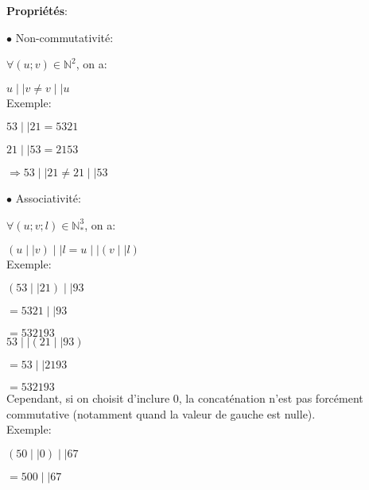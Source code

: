 \documentclass[a4paper, 12pt]{article}
\begin{document}
\noindent \textbf{Propriétés}:

\noindent $\bullet$ Non-commutativité:

$\forall \left( u; v \right) \in \mathbb{N}^{2}$, on a:

$u \mid\mid v \neq v \mid\mid u$ \\

Exemple:

\hspace{\parindent} $53 \mid\mid 21 = 5321$

\hspace{\parindent} $21 \mid\mid 53 = 2153$

\hspace{\parindent} $\Rightarrow 53 \mid\mid 21 \neq 21 \mid\mid 53$


\newpage

\noindent $\bullet$ Associativité:

$\forall \left( u; v; l \right) \in \mathbb{N}^{3}_{*}$, on a:

$\left( u \mid\mid v \right) \mid\mid l = u \mid\mid \left( v \mid\mid l \right)$ \\

Exemple:

\hspace{\parindent} $\left( 53 \mid\mid 21 \right) \mid\mid 93$

\hspace{\parindent} $= 5321 \mid\mid 93$

\hspace{\parindent} $= 532193$ \\

\hspace{\parindent} $53 \mid\mid \left( 21 \mid\mid 93 \right)$

\hspace{\parindent} $= 53 \mid\mid 2193$

\hspace{\parindent} $= 532193$ \\

Cependant, si on choisit d'inclure 0, la concaténation n'est pas forcément commutative
(notamment quand la valeur de gauche est nulle). \\

Exemple:

\hspace{\parindent} $\left( 50 \mid\mid 0 \right) \mid\mid 67$

\hspace{\parindent} $= 500 \mid\mid 67$
\end{document}
